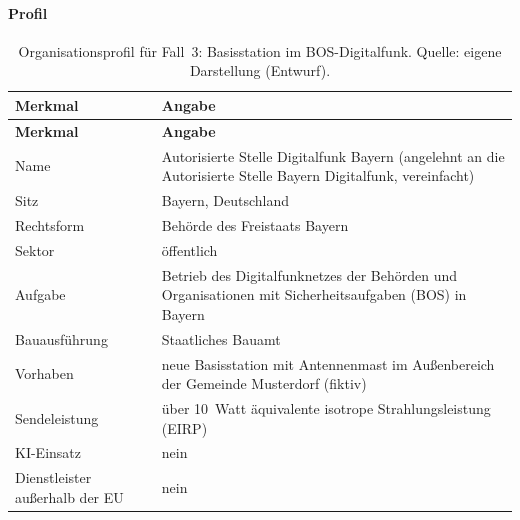\paragraph{Profil}
\begin{small}\begin{longtable}{@{}>{\raggedright\arraybackslash}p{5.0cm}>{\raggedright\arraybackslash}p{9.5cm}@{}}
\caption[Organisationsprofil für Fall~3]{Organisationsprofil für Fall~3: Basisstation im BOS-Digitalfunk. Quelle: eigene Darstellung (Entwurf).}\label{tab:fall3_profil}\\
\toprule \textbf{Merkmal} & \textbf{Angabe} \\ \midrule \endfirsthead
\toprule \textbf{Merkmal} & \textbf{Angabe} \\ \midrule \endhead
\bottomrule \endfoot
Name & Autorisierte Stelle Digitalfunk Bayern (angelehnt an die Autorisierte Stelle Bayern Digitalfunk, vereinfacht) \\
Sitz & Bayern, Deutschland \\
Rechtsform & Behörde des Freistaats Bayern \\
Sektor & öffentlich \\
Aufgabe & Betrieb des Digitalfunknetzes der Behörden und Organisationen mit Sicherheitsaufgaben (BOS) in Bayern \\
Bauausführung & Staatliches Bauamt \\
Vorhaben & neue Basisstation mit Antennenmast im Außenbereich der Gemeinde Musterdorf (fiktiv) \\
Sendeleistung & über 10~Watt äquivalente isotrope Strahlungsleistung (EIRP) \\
KI-Einsatz & nein \\
Dienstleister außerhalb der EU & nein \\
\end{longtable}\end{small}

